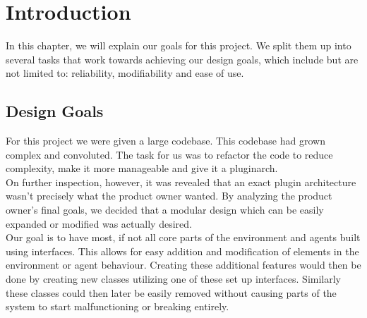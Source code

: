 \chapter{Introduction}

In this chapter, we will explain our goals for this project.
We split them up into several tasks that work towards achieving our design
goals, which include but are not limited to: reliability, modifiability and
ease of use.

\section{Design Goals}
For this project we were given a large codebase. This codebase had grown
complex and convoluted. The task for us was to refactor the code to reduce
complexity, make it more manageable and give it a \gls{pluginarch}. \\ On
further inspection, however, it was revealed that an exact plugin architecture
wasn't precisely what the product owner wanted. By analyzing the product
owner's final goals, we decided that a modular design which can be easily
expanded or modified was actually desired. \\ 
Our goal is to have most, if not all core parts of the environment and agents
built using interfaces. This allows for easy addition and modification of
elements in the environment or agent behaviour. Creating these additional
features would then be done by creating new classes utilizing one of these set
up interfaces. Similarly these classes could then later be easily removed
without causing parts of the system to start malfunctioning or breaking
entirely. \\

